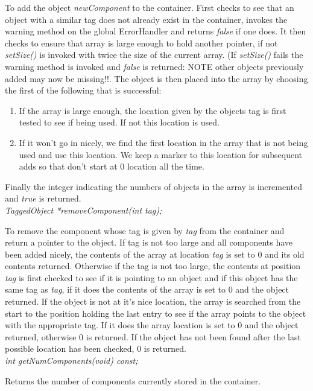To add the object {\em newComponent} to the container. First checks to
see that an object with a similar tag does not already exist in the
container, invokes the warning method on the global ErrorHandler and
returns {\em false} if one does. It then checks to ensure that array
is large enough to hold another pointer, if not {\em setSize()} is
invoked with twice the size of the current array. (If {\em setSize()}
fails the warning method is invoked and {\em false} is returned: NOTE
other objects previously added may now be missing!!. The object is
then placed into the array by choosing the first of the following that
is successful: \begin{enumerate} 
\item If the array is large enough, the location given by the objects
tag is first tested to see if being used. If not this location is
used.
\item If it won't go in nicely, we find the first location in the
array that is not being used and use this location. We keep a marker
to this location for subsequent adds so that don't start at $0$
location all the time.
\end{enumerate}
\noindent Finally the integer indicating the numbers of objects in the array is
incremented and {\em true} is returned. \\

 
{\em TaggedObject *removeComponent(int tag);}

To remove the component whose tag is given by {\em tag} from the
container and return a pointer to the object. If tag is not too large
and all components have been added nicely, the contents of the array
at location {\em tag} is set to $0$ and its old contents
returned. Otherwise if the tag is not too large, the contents at
position {\em tag} is first checked to see if it is pointing to an
object and if this object has the same tag as {\em tag}, if it does
the contents of the array is set to $0$ and the object returned. If
the object is not at it's nice location, the array is searched from
the start to the position holding the last entry to see if the array
points to the object with the appropriate tag. If it 
does the array location is set to $0$ and the object returned,
otherwise $0$ is returned. If the object has not been found after the
last possible location has been checked, $0$ is returned. \\

{\em int  getNumComponents(void) const;}

Returns the number of components currently stored in the container. \\

